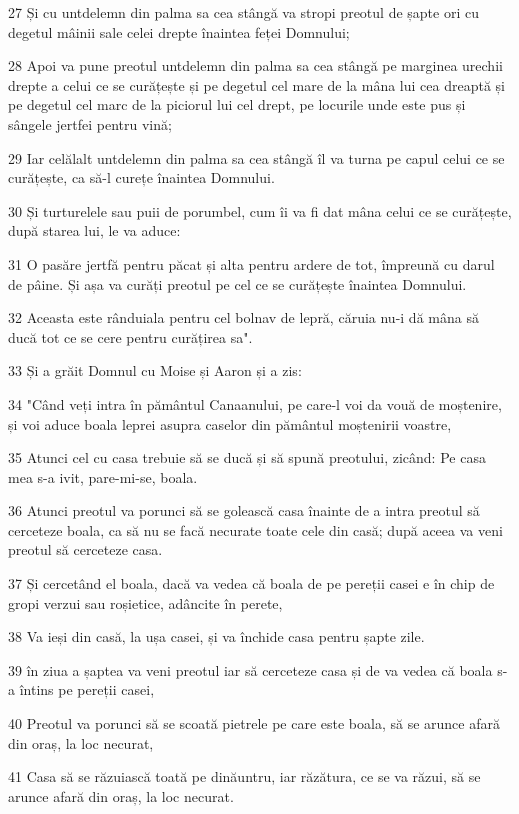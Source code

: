 \par 27 Și cu untdelemn din palma sa cea stângă va stropi preotul de șapte ori cu degetul mâinii sale celei drepte înaintea feței Domnului;
\par 28 Apoi va pune preotul untdelemn din palma sa cea stângă pe marginea urechii drepte a celui ce se curățește și pe degetul cel mare de la mâna lui cea dreaptă și pe degetul cel marc de la piciorul lui cel drept, pe locurile unde este pus și sângele jertfei pentru vină;
\par 29 Iar celălalt untdelemn din palma sa cea stângă îl va turna pe capul celui ce se curățește, ca să-l curețe înaintea Domnului.
\par 30 Și turturelele sau puii de porumbel, cum îi va fi dat mâna celui ce se curățește, după starea lui, le va aduce:
\par 31 O pasăre jertfă pentru păcat și alta pentru ardere de tot, împreună cu darul de pâine. Și așa va curăți preotul pe cel ce se curățește înaintea Domnului.
\par 32 Aceasta este rânduiala pentru cel bolnav de lepră, căruia nu-i dă mâna să ducă tot ce se cere pentru curățirea sa".
\par 33 Și a grăit Domnul cu Moise și Aaron și a zis:
\par 34 "Când veți intra în pământul Canaanului, pe care-l voi da vouă de moștenire, și voi aduce boala leprei asupra caselor din pământul moștenirii voastre,
\par 35 Atunci cel cu casa trebuie să se ducă și să spună preotului, zicând: Pe casa mea s-a ivit, pare-mi-se, boala.
\par 36 Atunci preotul va porunci să se golească casa înainte de a intra preotul să cerceteze boala, ca să nu se facă necurate toate cele din casă; după aceea va veni preotul să cerceteze casa.
\par 37 Și cercetând el boala, dacă va vedea că boala de pe pereții casei e în chip de gropi verzui sau roșietice, adâncite în perete,
\par 38 Va ieși din casă, la ușa casei, și va închide casa pentru șapte zile.
\par 39 în ziua a șaptea va veni preotul iar să cerceteze casa și de va vedea că boala s-a întins pe pereții casei,
\par 40 Preotul va porunci să se scoată pietrele pe care este boala, să se arunce afară din oraș, la loc necurat,
\par 41 Casa să se răzuiască toată pe dinăuntru, iar răzătura, ce se va răzui, să se arunce afară din oraș, la loc necurat.
